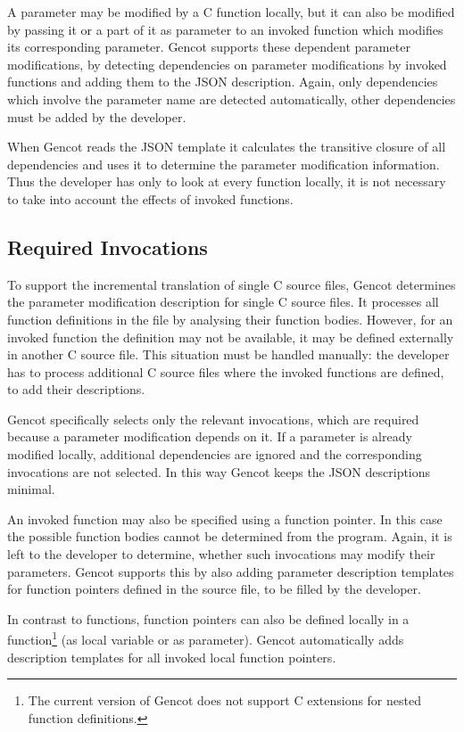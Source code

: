 A parameter may be modified by a C function locally, but it can 
also be modified by passing it or a part of it as parameter to an invoked function which modifies its corresponding
parameter. Gencot supports these dependent parameter modifications, by detecting dependencies on parameter
modifications by invoked functions and adding them to the JSON description. Again, only dependencies which
involve the parameter name are detected automatically, other dependencies must be added by the developer.

When Gencot reads the JSON template it calculates the transitive closure of all dependencies and uses it to
determine the parameter modification information. Thus the developer has only to look at every function locally,
it is not necessary to take into account the effects of invoked functions.

\subsection{Required Invocations}

To support the incremental translation of single C source files, Gencot determines the parameter modification
description for single C source files. It processes all function definitions in the file by analysing their 
function bodies. However, for an invoked function the definition may not be available, it may be defined externally
in another C source file. This situation must be handled manually: the developer has to process additional
C source files where the invoked functions are defined, to add their descriptions.

Gencot specifically selects only the relevant invocations, which are required because a parameter modification depends on it.
If a parameter is already modified locally, additional dependencies are ignored and the corresponding invocations
are not selected. In this way Gencot keeps the JSON descriptions minimal.

An invoked function may also be specified using a function pointer. In this case the possible function bodies cannot 
be determined from the program. Again, it is left to the developer to determine, whether such invocations may modify
their parameters. Gencot supports this by also adding parameter description templates for function pointers defined in the 
source file, to be filled by the developer. 

In contrast to functions, function pointers can also be defined locally in a function\footnote{The current version of
Gencot does not support C extensions for nested function definitions.} (as local variable or as parameter). Gencot
automatically adds description templates for all invoked local function pointers.

